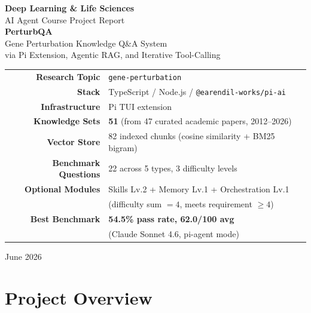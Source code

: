 \documentclass[12pt, a4paper]{article}
\begin{document}
\begin{titlepage}
  \centering
  \vspace*{2cm}
  {\LARGE\bfseries\color{mainblue} Deep Learning \& Life Sciences}\\[0.6em]
  {\large AI Agent Course Project Report}\\[2cm]

  {\Huge\bfseries PerturbQA}\\[0.5em]
  {\large\color{accentblue}
    Gene Perturbation Knowledge Q\&A System\\[0.3em]
    via Pi Extension, Agentic RAG, and Iterative Tool-Calling}\\[2.5cm]

  \begin{tabular}{rl}
    \textbf{Research Topic}      & \texttt{gene-perturbation}\\[0.4em]
    \textbf{Stack}               & TypeScript / Node.js / \texttt{@earendil-works/pi-ai}\\[0.4em]
    \textbf{Infrastructure}      & Pi TUI extension\\[0.4em]
    \textbf{Knowledge Sets}      & \textbf{51} (from 47 curated academic papers, 2012--2026)\\[0.4em]
    \textbf{Vector Store}        & 82 indexed chunks (cosine similarity + BM25 bigram)\\[0.4em]
    \textbf{Benchmark Questions} & 22 across 5 types, 3 difficulty levels\\[0.4em]
    \textbf{Optional Modules}    & Skills Lv.2 + Memory Lv.1 + Orchestration Lv.1\\
                                 & (difficulty sum $= 4$, meets requirement $\ge 4$)\\[0.4em]
    \textbf{Best Benchmark}      & \textbf{54.5\% pass rate, 62.0/100 avg}\\
                                 & (Claude Sonnet 4.6, pi-agent mode)\\
  \end{tabular}

  \vfill
  {\large June 2026}
\end{titlepage}

\tableofcontents
\newpage

\section{Project Overview}
\end{document}
